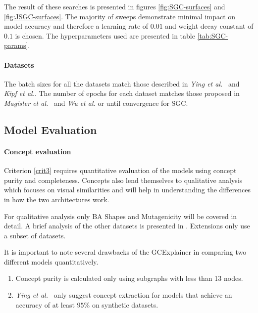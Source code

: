 The result of these searches is presented in figures \ref{fig:SGC-surfaces} and \ref{fig:JSGC-surfaces}.
The majority of sweeps demonstrate minimal impact on model accuracy and therefore a learning rate of $0.01$ and weight decay constant of $0.1$ is chosen.
The hyperparameters used are presented in table \ref{tab:SGC-params}.

%

\paragraph{Datasets}
The batch sizes for all the datasets match those described in \textit{Ying et al.}~\cite{ying2019gnnexplainer} and \textit{Kipf et al.}\cite{kipf2016semi}.
The number of epochs for each dataset matches those proposed in \textit{Magister et al.}~\cite{magister2021gcexplainer} and \textit{Wu et al.}\cite{wu2019simplifying} or until convergence for SGC.

\subsection{Model Evaluation}
\label{sec:evaluation}

\paragraph{Concept evaluation}
Criterion \ref{crit3} requires quantitative evaluation of the models using concept purity and completeness.
Concepts also lend themselves to qualitative analysis which focuses on visual similarities and will help in understanding the differences in how the two architectures work.

For qualitative analysis only BA Shapes and Mutagenicity will be covered in detail.
A brief analysis of the other datasets is presented in .
Extensions only use a subset of datasets.

It is important to note several drawbacks of the GCExplainer in comparing two different models quantitatively.
\begin{enumerate}
    \item 
        Concept purity is calculated only using subgraphs with less than 13 nodes.
    \item 
        \label{nb:accuracy}
        \textit{Ying et al.}~\cite{ying2019gnnexplainer} only suggest concept extraction for models that achieve an accuracy of at least $95\%$ on synthetic datasets. 
\end{enumerate}

